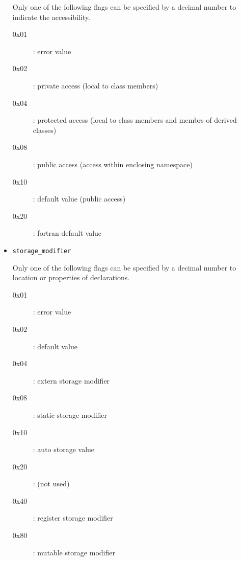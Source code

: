 \begin{itemize}
       Only one of the following flags can be specified by a decimal
       number to indicate the accessibility.
       \begin{description}
	\item[0x01]: error value
	\item[0x02]: private access (local to class members)
	\item[0x04]: protected access (local to class members and membrs of derived classes)
	\item[0x08]: public access (access within enclosing namespace)
	\item[0x10]: default value (public access)
	\item[0x20]: fortran default value
       \end{description}
 \item \texttt{storage\_modifier}

       Only one of the following flags can be specified by a decimal
       number to location or properties of declarations.
       \begin{description}
	\item[0x01]: error value
	\item[0x02]: default value
	\item[0x04]: extern storage modifier
	\item[0x08]: static storage modifier
	\item[0x10]: auto storage value
	\item[0x20]: (not used)
	\item[0x40]: register storage modifier
	\item[0x80]: mutable storage modifier
       \end{description}
\end{itemize}

